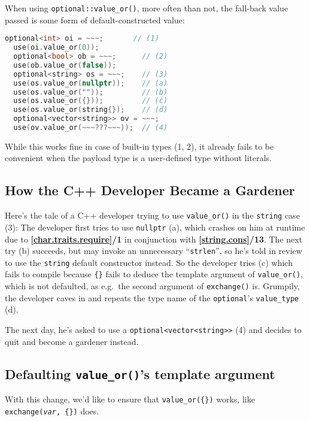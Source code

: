 \documentclass[11pt]{article}
\newcommand{\isnref}[2]{\textbf{[\href{https://wg21.link/#1\##2}{#1}]/#2}}
\begin{document}
When using \texttt{optional::value\_or()}, more often than not, the
fall-back value passed is some form of default-constructed value:

\begin{lstlisting}[language=c++]
  optional<int> oi = ~~~;       // (1)
  use(oi.value_or(0));
  optional<bool> ob = ~~~;      // (2)
  use(ob.value_or(false));
  optional<string> os = ~~~;    // (3)
  use(os.value_or(nullptr));    // (a)
  use(os.value_or(""));         // (b)
  use(os.value_or({}));         // (c)
  use(os.value_or(string{});    // (d)
  optional<vector<string>> ov = ~~~;
  use(ov.value_or(~~~???~~~));  // (4)
\end{lstlisting}

While this works fine in case of built-in types (1, 2), it already
fails to be convenient when the payload type is a user-defined type
without literals.

\subsection{How the C++ Developer Became a Gardener}

Here's the tale of a C++ developer trying to use \texttt{value\_or()}
in the \texttt{string} case (3): The developer first tries to use
\texttt{nullptr} (a), which crashes on him at runtime due to
\isnref{char.traits.require}1 in conjunction with
\isnref{string.cons}{13}. The next try (b) succeeds, but may invoke an
unnecessary ``\texttt{strlen}'', so he's told in review to use the
\texttt{string} default constructor instead. So the developer tries
(c) which fails to compile because \texttt{\{\}} fails to deduce the
template argument of \texttt{value\_or()}, which is not defaulted, as
e.g.\ the second argument of \texttt{exchange()} is. Grumpily, the
developer caves in and repeats the type name of the
\texttt{optional}'s \texttt{value\_type} (d).

The next day, he's asked to use a \texttt{optional<vector<string>>}
(4) and decides to quit and become a gardener instead.

\subsection{Defaulting \texttt{value\_or()}'s template argument}
\label{sec:defaulting}

With this change, we'd like to ensure that \texttt{value\_or(\{\})}
works, like \texttt{exchange(\textit{var}, \{\})} does.
\end{document}
